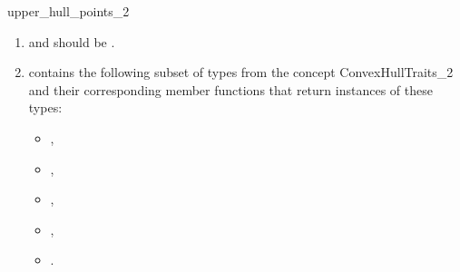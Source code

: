 \begin{ccRefFunction}{upper_hull_points_2}
\begin{enumerate}
   \item    {} and 
            should be .
   \item    {} contains the following subset of types from
            the concept ConvexHullTraits\_2 and their corresponding member
            functions that return instances of these types:
            \begin{itemize}
                \item {},
                \item {}, 
                \item {},
                \item {}, 
                \item {}.
            \end{itemize}
\end{enumerate}

\ccSeeAlso

 \\
 \\

\end{ccRefFunction}


